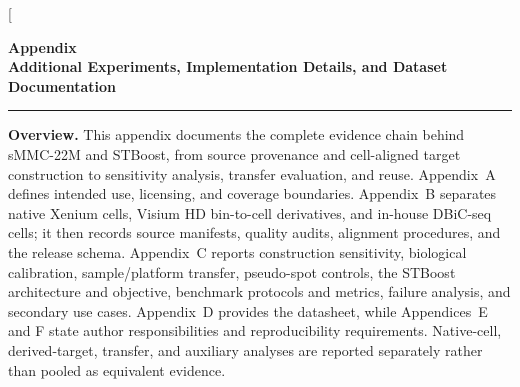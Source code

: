\documentclass[sigconf,review]{acmart}
\newcommand{\dataset}{sMMC-22M\xspace}
\newcommand{\methodname}{STBoost\xspace}
\begin{document}
\twocolumn[{
\begin{minipage}{\textwidth}
\begin{center}
{\Huge\bfseries Appendix}\\[4pt]
{\Large\bfseries Additional Experiments, Implementation Details, and Dataset Documentation}
\end{center}
\vspace{5pt}
\hrule
\vspace{7pt}

\noindent\textbf{Overview.}
This appendix documents the complete evidence chain behind \dataset and
\methodname, from source provenance and cell-aligned target construction to
sensitivity analysis, transfer evaluation, and reuse. Appendix~A defines
intended use, licensing, and coverage boundaries. Appendix~B separates native
Xenium cells, Visium HD bin-to-cell derivatives, and in-house DBiC-seq cells;
it then records source manifests, quality audits, alignment procedures, and
the release schema. Appendix~C reports construction sensitivity, biological
calibration, sample/platform transfer, pseudo-spot controls, the \methodname
architecture and objective, benchmark protocols and metrics, failure analysis,
and secondary use cases. Appendix~D provides the datasheet, while
Appendices~E and F state author responsibilities and reproducibility
requirements. Native-cell, derived-target, transfer, and auxiliary analyses
are reported separately rather than pooled as equivalent evidence.

\vspace{7pt}
\vspace{4pt}


\end{minipage}}
\end{document}
